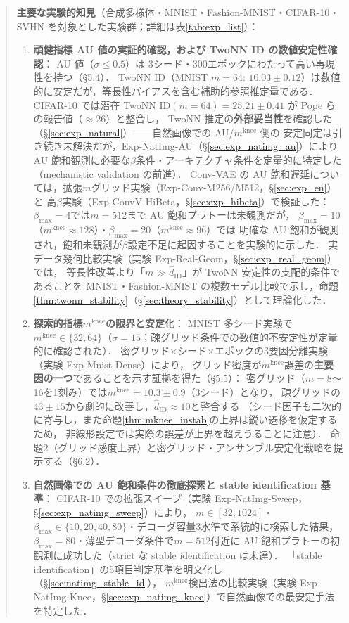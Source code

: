 \documentclass[11pt,a4paper]{jsarticle}
\newcommand{\mknee}{m^{\mathrm{knee}}}
\begin{document}
\begin{abstract}
\textbf{主要な実験的知見}（合成多様体・MNIST・Fashion-MNIST・CIFAR-10・SVHN を対象とした実験群；詳細は表\ref{tab:exp_list}）：
\begin{enumerate}
  \item \textbf{頑健指標 AU 値の実証的確認，および TwoNN ID の数値安定性確認}：
        AU 値（$\sigma \leq 0.5$）は 3シード・300エポックにわたって高い再現性を持つ（§5.4）．
        TwoNN ID（MNIST $m=64$: $10.03 \pm 0.12$）は数値的に安定だが，等長性バイアスを含む補助的参照推定量である．
        CIFAR-10 では潜在 TwoNN ID$(m=64)=25.21\pm0.41$ が Pope らの報告値（$\approx26$）と整合し，
        TwoNN 推定の\textbf{外部妥当性}を確認した（§\ref{sec:exp_natural}）——自然画像での AU/$\mknee$ 側の
        安定同定は引き続き未解決だが，Exp-NatImg-AU（§\ref{sec:exp_natimg_au}）により
        AU 飽和観測に必要な$\beta$条件・アーキテクチャ条件を定量的に特定した（mechanistic validation の前進）．
        Conv-VAE の AU 飽和遅延については，拡張$m$グリッド実験（Exp-Conv-M256/M512，§\ref{sec:exp_en}）と
        高$\beta$実験（Exp-ConvV-HiBeta，§\ref{sec:exp_hibeta}）で検証した：
        $\beta_{\max}=4$では$m=512$まで AU 飽和プラトーは未観測だが，
        $\beta_{\max}=10$（$\mknee \approx 128$）・$\beta_{\max}=20$（$\mknee \approx 96$）では
        明確な AU 飽和が観測され，飽和未観測が$\beta$設定不足に起因することを実験的に示した．
        実データ幾何比較実験（実験 Exp-Real-Geom，§\ref{sec:exp_real_geom}）では，
        等長性改善より「$m \gg \hat{d}_\mathrm{ID}$」が TwoNN 安定性の支配的条件であることを
        MNIST・Fashion-MNIST の複数モデル比較で示し，命題\ref{thm:twonn_stability}（§\ref{sec:theory_stability}）として理論化した．
  \item \textbf{探索的指標$\mknee$の限界と安定化}：
        MNIST 多シード実験で$\mknee \in \{32, 64\}$（$\sigma=15$；疎グリッド条件での数値的不安定性が定量的に確認された）．
        密グリッド×シード×エポックの3要因分離実験（実験 Exp-Mnist-Dense）により，
        グリッド密度が$\mknee$誤差の\textbf{主要因の一つ}であることを示す証拠を得た（§5.5）：
        密グリッド（$m=8$〜16を1刻み）では$\mknee = 10.3 \pm 0.9$（3シード）となり，
        疎グリッドの$43\pm15$から劇的に改善し，$\hat{d}_\mathrm{ID} \approx 10$と整合する
        （シード因子も二次的に寄与し，また命題\ref{thm:mknee_instab}の上界は鋭い遷移を仮定するため，
        非線形設定では実際の誤差が上界を超えうることに注意）．
        命題2（グリッド感度上界）と密グリッド・アンサンブル安定化戦略を提示する（§6.2）．
  \item \textbf{自然画像での AU 飽和条件の徹底探索と stable identification 基準}：
        CIFAR-10 での拡張スイープ（実験 Exp-NatImg-Sweep，§\ref{sec:exp_natimg_sweep}）により，
        $m \in [32, 1024]$・$\beta_{\max} \in \{10,20,40,80\}$・デコーダ容量3水準で系統的に検索した結果，
        $\beta_{\max}=80$・薄型デコーダ条件で$m=512$付近に AU 飽和プラトーの初観測に成功した（strict な stable identification は未達）．
        「stable identification」の5項目判定基準を明文化し（§\ref{sec:natimg_stable_id}），
        $\mknee$検出法の比較実験（実験 Exp-NatImg-Knee，§\ref{sec:exp_natimg_knee}）で自然画像での最安定手法を特定した．
\end{enumerate}


\end{abstract}
\end{document}
